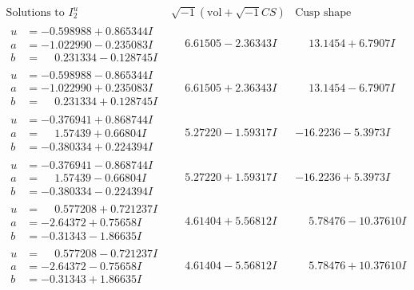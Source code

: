 \documentclass[1p]{elsarticle_modified}
\theoremstyle{definition}
\newcommand{\I}{\sqrt{-1}}
\begin{document}
$$\begin{array}{c|c|c}  
\text{Solutions to }I^u_{2}& \I (\text{vol} + \sqrt{-1}CS) & \text{Cusp shape}\\
 \hline 
\begin{aligned}
u &= -0.598988 + 0.865344 I \\
a &= -1.022990 - 0.235083 I \\
b &= \phantom{-}0.231334 - 0.128745 I\end{aligned}
 & \phantom{-}6.61505 - 2.36343 I & \phantom{-}13.1454 + 6.7907 I \\ \hline\begin{aligned}
u &= -0.598988 - 0.865344 I \\
a &= -1.022990 + 0.235083 I \\
b &= \phantom{-}0.231334 + 0.128745 I\end{aligned}
 & \phantom{-}6.61505 + 2.36343 I & \phantom{-}13.1454 - 6.7907 I \\ \hline\begin{aligned}
u &= -0.376941 + 0.868744 I \\
a &= \phantom{-}1.57439 + 0.66804 I \\
b &= -0.380334 + 0.224394 I\end{aligned}
 & \phantom{-}5.27220 - 1.59317 I & -16.2236 - 5.3973 I \\ \hline\begin{aligned}
u &= -0.376941 - 0.868744 I \\
a &= \phantom{-}1.57439 - 0.66804 I \\
b &= -0.380334 - 0.224394 I\end{aligned}
 & \phantom{-}5.27220 + 1.59317 I & -16.2236 + 5.3973 I \\ \hline\begin{aligned}
u &= \phantom{-}0.577208 + 0.721237 I \\
a &= -2.64372 + 0.75658 I \\
b &= -0.31343 - 1.86635 I\end{aligned}
 & \phantom{-}4.61404 + 5.56812 I & \phantom{-}5.78476 - 10.37610 I \\ \hline\begin{aligned}
u &= \phantom{-}0.577208 - 0.721237 I \\
a &= -2.64372 - 0.75658 I \\
b &= -0.31343 + 1.86635 I\end{aligned}
 & \phantom{-}4.61404 - 5.56812 I & \phantom{-}5.78476 + 10.37610 I \\ \hline\begin{aligned}

\end{aligned}
\end{array}$$
\end{document}
